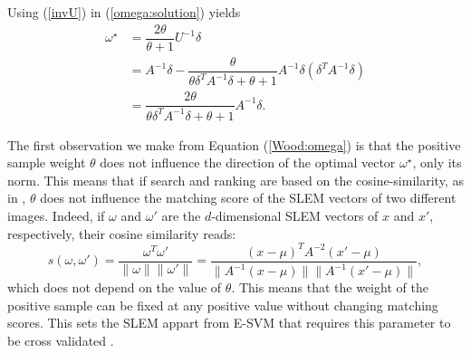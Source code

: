 Using (\ref{invU}) in (\ref{omega:solution}) yields
\begin{equation}
\begin{split}
\omega^\star &= \dfrac{2\theta}{\theta+1}U^{-1}\delta \\
&= A^{-1}\delta - \dfrac{\theta}{\theta\delta^TA^{-1}\delta+ \theta+1} A^{-1}\delta (\delta^TA^{-1}\delta)\\
&= \dfrac{2\theta}{\theta\delta^TA^{-1}\delta+ \theta+1} A^{-1}\delta.\label{Wood:omega}
\end{split}
\end{equation}

The first observation we make from Equation (\ref{Wood:omega}) is that the positive sample weight $\theta$ does not influence the direction of the optimal vector $\omega^\star$, only its norm. This means that if search and ranking are based on the cosine-similarity, as in \cite{ZePe15}, $\theta$ does not influence the matching score of the SLEM vectors of two different images.
Indeed, if $\omega$ and $\omega'$ are the $d$-dimensional SLEM vectors of $x$ and $x'$, respectively, their cosine similarity reads:
\begin{equation}
s(\omega, \omega') = \dfrac{\omega^T \omega'}{\|\omega\| \|\omega'\|} = \frac{(x-\mu)^TA^{-2}(x'-\mu)}{\|A^{-1}(x-\mu)\|\|A^{-1}(x'-\mu)\|},\label{match:score}
\end{equation}
which does not depend on the value of $\theta$. This means that the weight of the positive sample can be fixed at any positive value without changing matching scores. This sets the SLEM appart from E-SVM that requires this parameter to be cross validated \cite{Efros11,ZePe15}.


 
